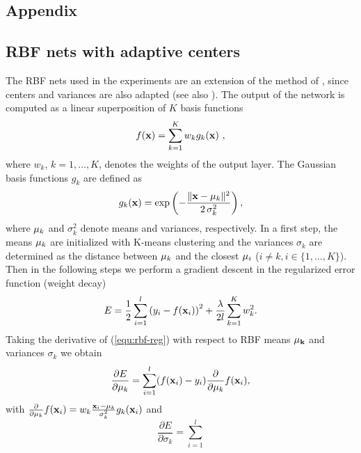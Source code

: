 \documentclass{article}
\begin{document}
\begin{appendix}
\section{Appendix}
\subsection{RBF nets with adaptive centers}
\label{app:rbf}

The RBF nets used in the experiments are an extension of the method of
\cite{MooDar89}, since centers and variances are also adapted (see also
\cite{Bis95,MueSmoRaeSchKohVap98}). The output of the network is
computed as a linear superposition of $K$ basis functions
\begin{equation}
  f({\bf x})=\sum_{k=1}^K w_k g_k({\bf x})~,
\end{equation}
where $w_k$, $k=1, \dots, K$, denotes the weights of the output layer.
The Gaussian basis functions $g_k$ are defined as
\begin{equation}
  g_k({\bf x})= \exp\left(-\frac{\|{\bf x}-{\bf \mu}_k\|^2}{2\,\sigma_k^2}\right),
\end{equation}
where ${\bf \mu}_k$ and $\sigma_k^2$ denote means and variances,
respectively. In a first step, the means ${\bf \mu}_k$ are initialized
with K-means clustering and the variances $\sigma_k$ are determined as
the distance between ${\bf \mu}_k$ and the closest ${\bf \mu}_i$
($i\ne k, i\in \{1,\ldots,K\}$). Then in the following steps we
perform a gradient descent in the regularized error function (weight
decay)
\begin{equation}
  E = \frac{1}{2}\sum_{i=1}^l \left(y_i - f({\bf x}_i)\right)^2 +
  \frac{\lambda}{2 l} \sum_{k=1}^K w_k^2.
\label{equ:rbf-reg} 
\end{equation}
%
%
Taking the derivative of (\ref{equ:rbf-reg}) with respect to
RBF means $\bf\mu_k$ and variances $\sigma_k$ we obtain
\begin{equation}
  \frac{\partial E}{\partial {\bf \mu}_k} =
    \sum_{i=1}^l (f({\bf x}_i)- y_i)\frac{\partial}{\partial {\bf \mu}_k}f({\bf x}_i), 
  \label{equ:grad_C_mu}
\end{equation}
with $\frac{\partial}{\partial {\bf \mu}_k} f({\bf x}_i) = w_k\frac{{\bf x}_i-{\bf
    \mu}_k}{\sigma_k^2} g_k({\bf x}_i)$ and
\begin{equation}
  \frac{\partial E}{\partial \sigma_k} = \sum_{i=1}^l

\end{equation}
\end{appendix}
\end{document}

